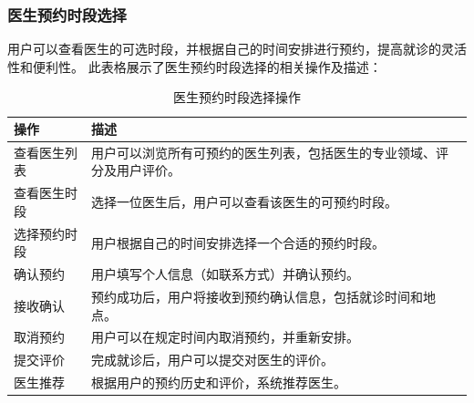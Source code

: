 \newpage

\subsubsection{医生预约时段选择}
用户可以查看医生的可选时段，并根据自己的时间安排进行预约，提高就诊的灵活性和便利性。
此表格展示了医生预约时段选择的相关操作及描述：
\begin{table}[htbp]
	\centering
	\begin{tabular}{|p{6cm}|p{6cm}|}
		\hline
		\textbf{操作} & \textbf{描述} \\
		\hline
		查看医生列表 & 用户可以浏览所有可预约的医生列表，包括医生的专业领域、评分及用户评价。 \\
		查看医生时段 & 选择一位医生后，用户可以查看该医生的可预约时段。 \\
		选择预约时段 & 用户根据自己的时间安排选择一个合适的预约时段。 \\
		确认预约 & 用户填写个人信息（如联系方式）并确认预约。 \\
		接收确认 & 预约成功后，用户将接收到预约确认信息，包括就诊时间和地点。 \\
		取消预约 & 用户可以在规定时间内取消预约，并重新安排。 \\
		提交评价 & 完成就诊后，用户可以提交对医生的评价。 \\
		医生推荐 & 根据用户的预约历史和评价，系统推荐医生。 \\
		\hline
	\end{tabular}
	\caption{医生预约时段选择操作}
\end{table}

